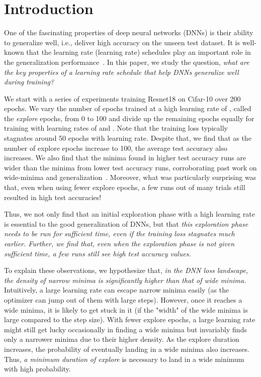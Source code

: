 \documentclass[twoside,11pt]{article}
\begin{document}
\section{Introduction}
\label{sec:introduction}

One of the fascinating properties of deep neural networks (DNNs) is their ability to generalize well, i.e., deliver high accuracy on the unseen test dataset. It is well-known that the learning rate (learning rate) schedules  play an important role in the generalization performance~\citep{keskar2016large,wu2018sgd,goyal-imagenet-in-an-hour-2017}. In this paper, we study the question, {\it what are the key properties of a learning rate schedule that help DNNs generalize well during training?} 







We start with a series of experiments training Resnet18 on Cifar-10 over 200 epochs. We vary the number of epochs trained at a high learning rate of , called the {\it explore} epochs, from 0 to 100  and divide up the remaining epochs equally for training with learning rates of  and . Note that the training loss typically stagnates around 50 epochs with  learning rate. Despite that, we find that as the number of explore epochs increase to 100, the average test accuracy also increases. We also find that the minima found in higher test accuracy runs are wider than the minima from lower test accuracy runs, corroborating past work on wide-minima and generalization~\citep{keskar2016large,hochreiter1997flat,jastrzkebski2017three,wang2018identifying}. Moreover, what was particularly surprising was that, even when using fewer explore epochs, a few runs out of many trials still resulted in high test accuracies!

Thus, we not only find that an initial exploration phase with a high learning rate is essential to the good generalization of DNNs, but that {\it this exploration phase needs to be run for sufficient time, even if the training loss stagnates much earlier. Further, we find that, even when the exploration phase is not given sufficient time, a few runs still see high test accuracy values.}






To explain these observations, we hypothesize that, {\it in the DNN loss landscape, the density of narrow minima is significantly higher than that of wide minima.} Intuitively, a large learning rate can escape narrow minima easily (as the optimizer can jump out of them with large steps). However, once it reaches a wide minima, it is likely to get stuck in it (if the "width" of the wide minima is large compared to the step size). With fewer explore epochs, a large learning rate might still get lucky occasionally in finding a wide minima but invariably finds only a narrower minima due to their higher density. As the explore duration increases, the probability of eventually landing in a wide minima also increases. Thus, {\it a minimum duration of explore} is necessary to land in a wide minimum with high probability. 
\end{document}
